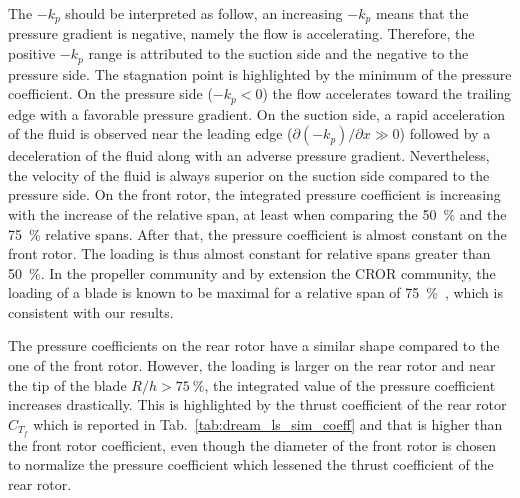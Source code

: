The $- k_p$ should be interpreted as follow, an increasing $- k_p$
means that the pressure gradient is negative, namely the flow
is accelerating. Therefore, the positive  $-k_p$ range is attributed
to the suction side and the negative to the pressure side.
The stagnation point is highlighted
by the minimum of the pressure coefficient. On the pressure side 
($-k_p < 0$) the flow accelerates
toward the trailing edge with a favorable pressure gradient. 
On the suction side, a rapid acceleration of the fluid
is observed near the leading edge 
($\partial (-k_p) / \partial x \gg 0$) followed by
a deceleration of the fluid along with an
adverse pressure gradient.
Nevertheless, the velocity of the fluid is always superior
on the suction side compared to the pressure side.
On the front rotor, the integrated pressure coefficient is
increasing with the increase of the relative span, at least 
when comparing the 50~\% and the 75~\% relative spans.
After that, the pressure coefficient is almost constant on 
the front rotor. The loading is thus almost constant for
relative spans greater than 50~\%. In the propeller community and
by extension the CROR community, the loading of a blade is known
to be maximal for a relative span of 75~\%~\cite{Bousquet2012},
which is consistent with our results.

The pressure coefficients on the rear rotor have a similar shape
compared to the one of the front rotor. However, the loading is
larger on the rear rotor and near the tip of the blade
$R/h > 75~\%$, the integrated value of the pressure coefficient
increases drastically. This is highlighted by the thrust coefficient 
of the rear rotor $C_{T_f}$ which is reported in 
Tab.~\ref{tab:dream_ls_sim_coeff} and that is higher than
the front rotor coefficient, even though the diameter of the front
rotor is chosen to normalize the pressure coefficient which
lessened the thrust coefficient of the rear rotor.

